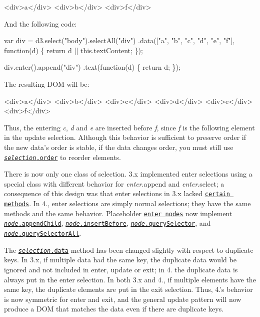 \begin{DoxyCode}
<div>a</div>
<div>b</div>
<div>f</div>
\end{DoxyCode}


And the following code\+:


\begin{DoxyCode}
var div = d3.select("body").selectAll("div")
  .data(["a", "b", "c", "d", "e", "f"], function(d) \{ return d || this.textContent; \});

div.enter().append("div")
    .text(function(d) \{ return d; \});
\end{DoxyCode}


The resulting D\+OM will be\+:


\begin{DoxyCode}
<div>a</div>
<div>b</div>
<div>c</div>
<div>d</div>
<div>e</div>
<div>f</div>
\end{DoxyCode}


Thus, the entering {\itshape c}, {\itshape d} and {\itshape e} are inserted before {\itshape f}, since {\itshape f} is the following element in the update selection. Although this behavior is sufficient to preserve order if the new data’s order is stable, if the data changes order, you must still use \href{https://github.com/d3/d3-selection/blob/master/README.md#selection_order}{\tt {\itshape selection}.order} to reorder elements.

There is now only one class of selection. 3.\+x implemented enter selections using a special class with different behavior for {\itshape enter}.append and {\itshape enter}.select; a consequence of this design was that enter selections in 3.\+x lacked \href{https://github.com/d3/d3/issues/2043}{\tt certain methods}. In 4., enter selections are simply normal selections; they have the same methods and the same behavior. Placeholder \href{https://github.com/d3/d3-selection/blob/master/src/selection/enter.js}{\tt enter nodes} now implement \href{https://developer.mozilla.org/en-US/docs/Web/API/Node/appendChild}{\tt {\itshape node}.append\+Child}, \href{https://developer.mozilla.org/en-US/docs/Web/API/Node/insertBefore}{\tt {\itshape node}.insert\+Before}, \href{https://developer.mozilla.org/en-US/docs/Web/API/Element/querySelector}{\tt {\itshape node}.query\+Selector}, and \href{https://developer.mozilla.org/en-US/docs/Web/API/Element/querySelectorAll}{\tt {\itshape node}.query\+Selector\+All}.

The \href{https://github.com/d3/d3-selection/blob/master/README.md#selection_data}{\tt {\itshape selection}.data} method has been changed slightly with respect to duplicate keys. In 3.\+x, if multiple data had the same key, the duplicate data would be ignored and not included in enter, update or exit; in 4. the duplicate data is always put in the enter selection. In both 3.\+x and 4., if multiple elements have the same key, the duplicate elements are put in the exit selection. Thus, 4.’s behavior is now symmetric for enter and exit, and the general update pattern will now produce a D\+OM that matches the data even if there are duplicate keys.

